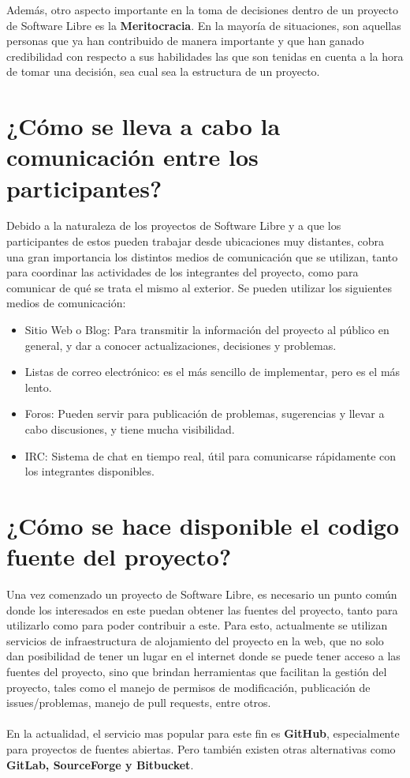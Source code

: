 Además, otro aspecto importante en la toma de decisiones dentro de un proyecto de Software Libre es la {\bf Meritocracia}. En la mayoría de situaciones, son aquellas personas que ya han contribuido de manera importante y que han ganado credibilidad con respecto a sus habilidades las que son tenidas en cuenta a la hora de tomar una decisión, sea cual sea la estructura de un proyecto.


\section{¿Cómo se lleva a cabo la comunicación entre los participantes?}

Debido a la naturaleza de los proyectos de Software Libre y a que los participantes de estos pueden trabajar desde ubicaciones muy distantes, cobra una gran importancia los distintos medios de comunicación que se utilizan, tanto para coordinar las actividades de los integrantes del proyecto, como para comunicar de qué se trata el mismo al exterior.
Se pueden utilizar los siguientes medios de comunicación: 

\begin{itemize}
     \item Sitio Web o Blog: Para transmitir la información del proyecto al público en general, y dar a conocer actualizaciones, decisiones y problemas.
     \item Listas de correo electrónico: es el más sencillo de implementar, pero es el más lento.
     \item Foros: Pueden servir para publicación de problemas, sugerencias y llevar a cabo discusiones, y tiene mucha visibilidad.
     \item IRC: Sistema de chat en tiempo real, útil para comunicarse rápidamente con los integrantes disponibles.
\end{itemize}

\section{¿Cómo se hace disponible el codigo fuente del proyecto?}

Una vez comenzado un proyecto de Software Libre, es necesario un punto común donde los interesados en este puedan obtener las fuentes del proyecto, tanto para utilizarlo como para poder contribuir a este.
Para esto, actualmente se utilizan servicios de infraestructura de alojamiento del proyecto en la web, que no solo dan posibilidad de tener un lugar en el internet donde se puede tener acceso a las fuentes del proyecto, sino que brindan herramientas que facilitan la gestión del proyecto, tales como el manejo de permisos de modificación, publicación de issues/problemas, manejo de pull requests, entre otros.
\\
\\
En la actualidad, el servicio mas popular para este fin es {\bf GitHub}, especialmente para proyectos de fuentes abiertas. Pero también existen otras alternativas como {\bf GitLab, SourceForge y Bitbucket}.

